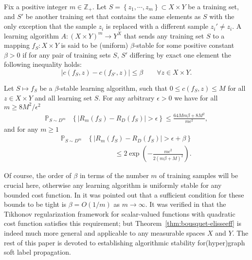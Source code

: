 \documentclass[letterpaper]{article} %
\begin{document}
\begin{definition}
  \label{defn:uniform-stability}
  Fix a positive integer $m\in\mathbb{Z}_+$. Let $S=\left\{ z_1,\cdots,z_m \right\}\subset X\times Y$ be a training set, and $S'$ be another training set that contains the same elements as $S$ with the only exception that the sample $z_i$ is replaced with a different sample $z_i'\neq z_i$. A learning algorithm $A:\left( X\times Y \right)^m\rightarrow Y^X$ that sends any training set $S$ to a mapping $f_S:X\times Y$ is said to be (uniform) $\beta$-stable for some positive constant $\beta>0$ if for any pair of training sets $S$, $S'$ differing by exact one element the following inequality holds:
  \begin{equation*}
    \left| c \left( f_S,z \right)-c\left(f_{S'},z\right) \right|\leq \beta\qquad\forall z\in X\times Y.
  \end{equation*}
\end{definition}
\begin{theorem}
  \label{thm:bousquet-elisseeff}
  Let $S\mapsto f_S$ be a $\beta$-stable learning algorithm, such that $0\leq c \left( f_S,z \right)\leq M$ for all $z\in X\times Y$ and all learning set $S$. For any arbitrary $\epsilon>0$ we have for all $m\geq 8M^2/\epsilon^2$
  \begin{equation}
    \label{eq:fraction-bounds}
    \begin{aligned}
    \mathbb{P}_{S\sim D^m} &\left\{ \left| R_m \left( f_S \right)-R_D \left( f_S \right) \right| > \epsilon\right\}\leq \frac{64 Mm\beta+8M^2}{m\epsilon^2},
    \end{aligned}
  \end{equation}
  and for any $m\geq 1$
  \begin{equation}
    \label{eq:exponential-bounds}
    \begin{aligned}
    \mathbb{P}_{S\sim D^m}&\left\{ \left| R_m \left( f_S \right)-R_D \left( f_S \right) \right| > \epsilon+\beta\right\}\\
    &\qquad\qquad\leq 2\exp \left( -\frac{m\epsilon^2}{2 \left( m\beta+M \right)^2} \right).
    \end{aligned}
  \end{equation}
\end{theorem}
Of course, the order of $\beta$ in terms of the number $m$ of training samples will be crucial here, otherwise any learning algorithm is uniformly stable for any bounded cost function. In \cite{Algorithmic_Stability} it was pointed out that a sufficient condition for these bounds to be tight is $\beta=O \left( 1/m \right)$ as $m\rightarrow\infty$. It was verified in \cite{Algorithmic_Stability} that the Tikhonov regularization framework for scalar-valued functions with quadratic cost function satisfies this requirement; but Theorem~\ref{thm:bousquet-elisseeff} is indeed much more general and applicable to any measurable spaces $X$ and $Y$. The rest of this paper is devoted to establishing algorithmic stability for(hyper)graph soft label propagation. %
\end{document}
